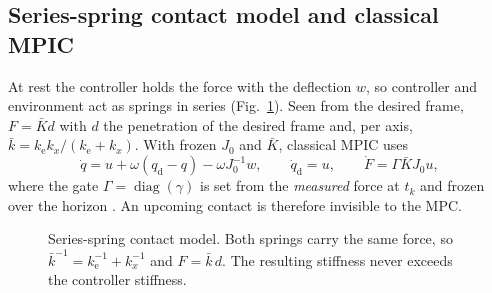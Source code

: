 \documentclass[11pt,a4paper]{article}
\newcommand{\Kbar}{\bar{K}}
\newcommand{\kb}{\bar{k}}
\newcommand{\qd}{q_{\mathrm{d}}}
\newcommand{\dqd}{\dot{q}_{\mathrm{d}}}
\newcommand{\phat}{\hat{p}_{\mathrm{o}}}
\newcommand{\ke}{k_{\mathrm{e}}}
\newcommand{\kx}{k_{x}}
\begin{document}
\subsection{Series-spring contact model and classical MPIC}
At rest the controller holds the force with the deflection $w$, so controller and environment act as
springs in series (Fig.~\ref{fig:springs}). Seen from the desired frame, $F=\Kbar d$ with $d$ the
penetration of the desired frame and, per axis, $\kb=\ke\kx/(\ke+\kx)$. With frozen $J_0$ and $\Kbar$,
classical MPIC uses
\begin{equation}\label{eq:mpic}
\dot q=u+\omega(\qd-q)-\omega J_0^{-1}w,\qquad \dqd=u,\qquad \dot F=\Gamma\Kbar J_0 u ,
\end{equation}
where the gate $\Gamma=\operatorname{diag}(\gamma)$ is set from the \emph{measured} force at $t_k$ and frozen
over the horizon \cite[eq.~24]{gold2023}. An upcoming contact is therefore invisible to the MPC.

\begin{figure}[!htbp]
\centering
{}
\caption{Series-spring contact model. Both springs carry the same force, so
$\kb^{-1}=\ke^{-1}+\kx^{-1}$ and $F=\kb\,d$. The resulting stiffness never exceeds the controller
stiffness.}
\label{fig:springs}
\end{figure}
\end{document}

